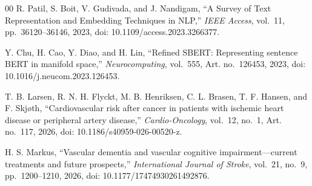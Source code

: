 \documentclass[a4paper,10pt,conference]{IEEEtran}
\begin{document}
\begin{thebibliography}{00}
 R. Patil, S. Boit, V. Gudivada, and J. Nandigam, ``A Survey of Text Representation and Embedding Techniques in NLP,'' \textit{IEEE Access}, vol.~11, pp.~36120--36146, 2023, doi: 10.1109/access.2023.3266377.

 Y. Chu, H. Cao, Y. Diao, and H. Lin, ``Refined SBERT: Representing sentence BERT in manifold space,'' \textit{Neurocomputing}, vol.~555, Art. no.~126453, 2023, doi: 10.1016/j.neucom.2023.126453.

 T. B. Larsen, R. N. H. Flyckt, M. B. Henriksen, C. L. Brasen, T. F. Hansen, and F. Skjøth, ``Cardiovascular risk after cancer in patients with ischemic heart disease or peripheral artery disease,'' \textit{Cardio-Oncology}, vol.~12, no.~1, Art. no.~117, 2026, doi: 10.1186/s40959-026-00520-z.

 H. S. Markus, ``Vascular dementia and vascular cognitive impairment—current treatments and future prospects,'' \textit{International Journal of Stroke}, vol.~21, no.~9, pp.~1200--1210, 2026, doi: 10.1177/17474930261492876.
\end{thebibliography}
\end{document}

